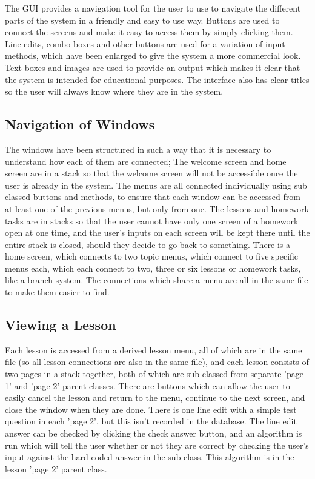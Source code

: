 The GUI provides a navigation tool for the user to use to navigate the different parts of the system in a friendly and easy to use way. Buttons are used to connect the screens and make it easy to access them by simply clicking them. Line edits, combo boxes and other buttons are used for a variation of input methods, which have been enlarged to give the system a more commercial look. Text boxes and images are used to provide an output which makes it clear that the system is intended for educational purposes. The interface also has clear titles so the user will always know where they are in the system.

\subsection{Navigation of Windows}

The windows have been structured in such a way that it is necessary to understand how each of them are connected; The welcome screen and home screen are in a stack so that the welcome screen will not be accessible once the user is already in the system. The menus are all connected individually using sub classed buttons and methods, to ensure that each window can be accessed from at least one of the previous menus, but only from one. The lessons and homework tasks are in stacks so that the user cannot have only one screen of a homework open at one time, and the user's inputs on each screen will be kept there until the entire stack is closed, should they decide to go back to something. There is a home screen, which connects to two topic menus, which connect to five specific menus each, which each connect to two, three or six lessons or homework tasks, like a branch system. The connections which share a menu are all in the same file to make them easier to find.

\subsection{Viewing a Lesson}

Each lesson is accessed from a derived lesson menu, all of which are in the same file (so all lesson connections are also in the same file), and each lesson consists of two pages in a stack together, both of which are sub classed from separate 'page 1' and 'page 2' parent classes. There are buttons which can allow the user to easily cancel the lesson and return to the menu, continue to the next screen, and close the window when they are done. There is one line edit with a simple test question in each 'page 2', but this isn't recorded in the database. The line edit answer can be checked by clicking the check answer button, and an algorithm is run which will tell the user whether or not they are correct by checking the user's input against the hard-coded answer in the sub-class. This algorithm is in the lesson 'page 2' parent class.

